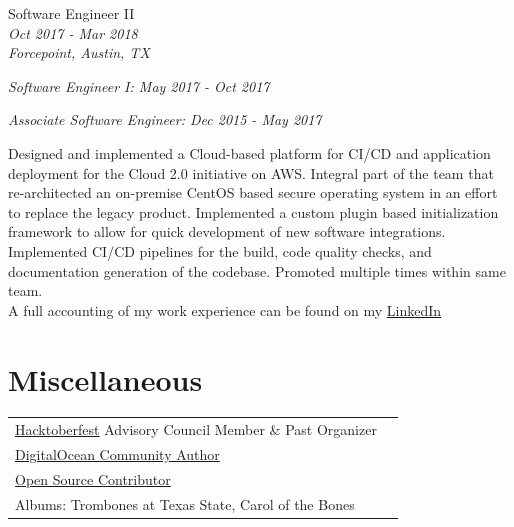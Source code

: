 \documentclass[10pt]{article} %
\begin{document}
\begin{minipage}[t]{0.5\textwidth}
{
\raggedright\large  Software Engineer II\\
\small \textit{Oct 2017 - Mar 2018}\\
\small \textit{Forcepoint, Austin, TX}\\
\raggedright\small \textit{Software Engineer I: May 2017 - Oct 2017}\\
\raggedright\small \textit{Associate Software Engineer: Dec 2015 - May 2017}\\
[5pt]
}

\normalsize{Designed and implemented a Cloud-based platform for CI/CD and application deployment for the Cloud 2.0 initiative on AWS. Integral part of the team that re-architected an on-premise CentOS based secure operating system in an effort to replace the legacy product. Implemented a custom plugin based initialization framework to allow for quick development of new software integrations. Implemented CI/CD pipelines for the build, code quality checks, and documentation generation of the codebase. Promoted multiple times within same team.}\\


A full accounting of my work experience can be found on my \href{https://www.linkedin.com/in/mason-egger/}{LinkedIn}\\


\section{Miscellaneous}

\begin{tabular}{ll}
\href{https://hacktoberfest.digitalocean.com/}{Hacktoberfest} Advisory Council Member \& Past Organizer \\
\href{https://www.digitalocean.com/community/users/masonegger?subtype=tutorial}{DigitalOcean Community Author} \\
\href{https://github.com/masonegger}{Open Source Contributor} \\
Albums: Trombones at Texas State, Carol of the Bones \\
\end{tabular}\\

\end{minipage}
\hfill
\end{document}
